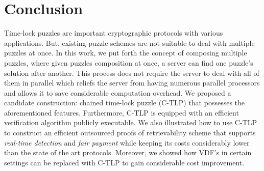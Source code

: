 

\section{Conclusion}


Time-lock puzzles are important cryptographic protocols with various applications. But,  existing puzzle schemes are not suitable to deal with multiple puzzles at once.  In this work, we put forth the concept of composing multiple puzzles, where given puzzles composition at once, a server can find one puzzle's solution after another. This process does not require the server to deal with all of them in parallel which reliefs the server from having numerous parallel processors and allows it to save considerable computation overhead. We proposed a candidate construction: chained  time-lock puzzle (C-TLP) that possesses the aforementioned features. Furthermore, C-TLP is equipped with an efficient verification algorithm publicly executable.  We also illustrated how to use C-TLP to construct an  efficient outsourced  proofs of retrievability scheme that supports \emph{real-time detection} and \emph{fair payment} while keeping its costs considerably lower than the state of the art protocols. Moreover, we showed how VDF's in certain settings can be replaced with C-TLP to gain considerable cost improvement.





